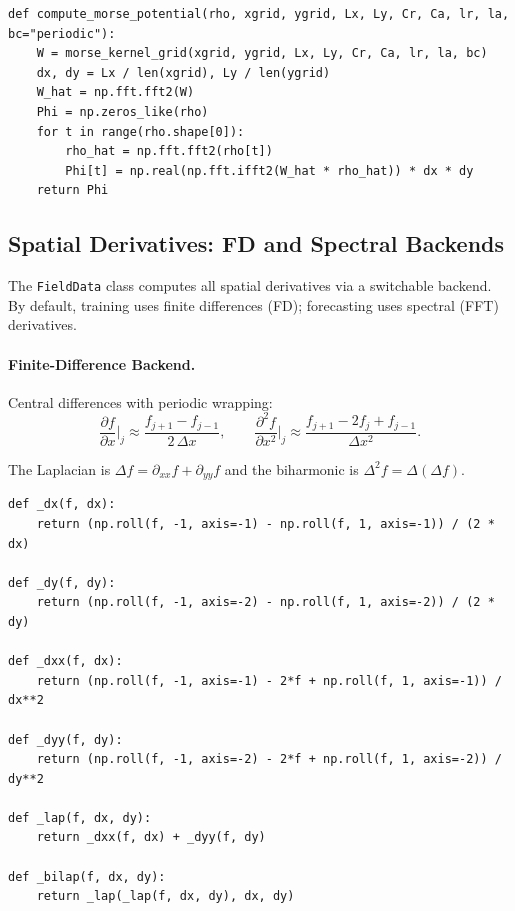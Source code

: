 \documentclass[11pt]{article}
\begin{document}
\begin{lstlisting}[caption={fields.py --- FFT convolution for $\Phi = W * \rho$}]
def compute_morse_potential(rho, xgrid, ygrid, Lx, Ly, Cr, Ca, lr, la, bc="periodic"):
    W = morse_kernel_grid(xgrid, ygrid, Lx, Ly, Cr, Ca, lr, la, bc)
    dx, dy = Lx / len(xgrid), Ly / len(ygrid)
    W_hat = np.fft.fft2(W)
    Phi = np.zeros_like(rho)
    for t in range(rho.shape[0]):
        rho_hat = np.fft.fft2(rho[t])
        Phi[t] = np.real(np.fft.ifft2(W_hat * rho_hat)) * dx * dy
    return Phi
\end{lstlisting}


\subsection{Spatial Derivatives: FD and Spectral Backends}

The \texttt{FieldData} class computes all spatial derivatives via a
switchable backend.  By default, training uses finite differences (FD);
forecasting uses spectral (FFT) derivatives.

\paragraph{Finite-Difference Backend.}
Central differences with periodic wrapping:
\begin{equation}
  \frac{\partial f}{\partial x}\bigg|_{j}
  \approx \frac{f_{j+1} - f_{j-1}}{2\,\Delta x},
  \qquad
  \frac{\partial^2 f}{\partial x^2}\bigg|_{j}
  \approx \frac{f_{j+1} - 2f_j + f_{j-1}}{\Delta x^2}.
\end{equation}

The Laplacian is $\Delta f = \partial_{xx} f + \partial_{yy} f$ and
the biharmonic is $\Delta^2 f = \Delta(\Delta f)$.

\begin{lstlisting}[caption={fields.py --- Finite-difference stencils}]
def _dx(f, dx):
    return (np.roll(f, -1, axis=-1) - np.roll(f, 1, axis=-1)) / (2 * dx)

def _dy(f, dy):
    return (np.roll(f, -1, axis=-2) - np.roll(f, 1, axis=-2)) / (2 * dy)

def _dxx(f, dx):
    return (np.roll(f, -1, axis=-1) - 2*f + np.roll(f, 1, axis=-1)) / dx**2

def _dyy(f, dy):
    return (np.roll(f, -1, axis=-2) - 2*f + np.roll(f, 1, axis=-2)) / dy**2

def _lap(f, dx, dy):
    return _dxx(f, dx) + _dyy(f, dy)

def _bilap(f, dx, dy):
    return _lap(_lap(f, dx, dy), dx, dy)
\end{lstlisting}
\end{document}
